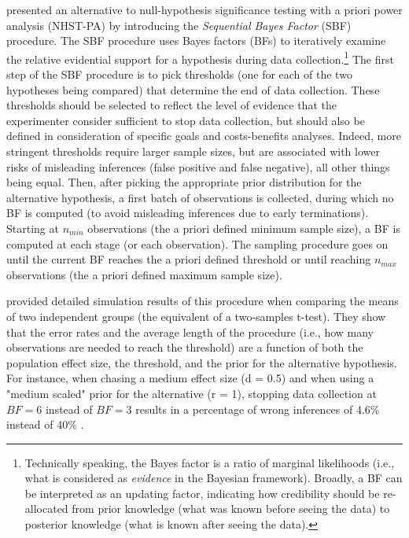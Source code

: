 \documentclass[a4paper,jou,natbib,floatsintext,donotrepeattitle]{apa6}
\begin{document}
\cite{schonbrodt_sequential_2017} presented an alternative to null-hypothesis significance testing with a priori power analysis (NHST-PA) by introducing the \textit{Sequential Bayes Factor} (SBF) procedure. The SBF procedure uses Bayes factors (BFs) to iteratively examine the relative evidential support for a hypothesis during data collection.\footnote{Technically speaking, the Bayes factor is a ratio of marginal likelihoods (i.e., what is considered as \textit{evidence} in the Bayesian framework). Broadly, a BF can be interpreted as an updating factor, indicating how credibility should be re-allocated from prior knowledge (what was known before seeing the data) to posterior knowledge (what is known after seeing the data).} The first step of the SBF procedure is to pick thresholds (one for each of the two hypotheses being compared) that determine the end of data collection. These thresholds should be selected to reflect the level of evidence that the experimenter consider sufficient to stop data collection, but should also be defined in consideration of specific goals and costs-benefits analyses. Indeed, more stringent thresholds require larger sample sizes, but are associated with lower risks of misleading inferences (false positive and false negative), all other things being equal. Then, after picking the appropriate prior distribution for the alternative hypothesis, a first batch of observations is collected, during which no BF is computed (to avoid misleading inferences due to early terminations). Starting at $n_{min}$ observations (the a priori defined minimum sample size), a BF is computed at each stage (or each observation). The sampling procedure goes on until the current BF reaches the a priori defined threshold or until reaching $n_{max}$ observations (the a priori defined maximum sample size).


\cite{schonbrodt_sequential_2017} provided detailed simulation results of this procedure when comparing the means of two independent groups (the equivalent of a two-samples t-test). They show that the error rates and the average length of the procedure (i.e., how many observations are needed to reach the threshold) are a function of both the population effect size, the threshold, and the prior for the alternative hypothesis. For instance, when chasing a medium effect size (d = 0.5) and when using a "medium scaled" prior for the alternative (r = 1), stopping data collection at $BF = 6$ instead of $BF = 3$ results in a percentage of wrong inferences of 4.6\% instead of 40\% \citep[see Table 1 in][p. 10]{schonbrodt_sequential_2017}.
\end{document}
